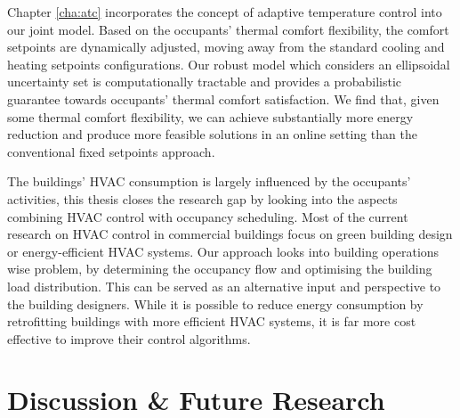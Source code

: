 Chapter \ref{cha:atc} incorporates the concept of adaptive temperature control into our joint model. Based on the occupants' thermal comfort flexibility, the comfort setpoints are dynamically adjusted, moving away from the standard cooling and heating setpoints configurations. Our robust model which considers an ellipsoidal uncertainty set is computationally tractable and provides a probabilistic guarantee towards occupants' thermal comfort satisfaction. We find that, given some thermal comfort flexibility, we can achieve substantially more energy reduction and produce more feasible solutions in an online setting than the conventional fixed setpoints approach.

The buildings' HVAC consumption is largely influenced by the occupants' activities, this thesis closes the research gap by looking into the aspects combining HVAC control with occupancy scheduling. Most of the current research on HVAC control in commercial buildings focus on green building design or energy-efficient HVAC systems. Our approach looks into building operations wise problem, by determining the occupancy flow and optimising the building load distribution. This can be served as an alternative input and perspective to the building designers. While it is possible to reduce energy consumption by retrofitting buildings with more efficient HVAC systems, it is far more cost effective to improve their control algorithms. 


%
%

\section{Discussion \& Future Research}

